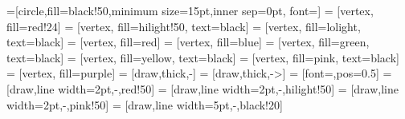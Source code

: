 =[circle,fill=black!50,minimum size=15pt,inner sep=0pt, font=\small]
 = [vertex, fill=red!24]
 = [vertex, fill=hilight!50, text=black]
 = [vertex, fill=lolight, text=black]
 = [vertex, fill=red]
 = [vertex, fill=blue]
 = [vertex, fill=green, text=black]
 = [vertex, fill=yellow, text=black]
 = [vertex, fill=pink, text=black]
 = [vertex, fill=purple]
 = [draw,thick,-]
 = [draw,thick,->]
 = [font=\scriptsize,pos=0.5]
 = [draw,line width=2pt,-,red!50]
 = [draw,line width=2pt,-,hilight!50]
 = [draw,line width=2pt,-,pink!50]
 = [draw,line width=5pt,-,black!20]

\def\hepta{\draw[foreground](A) -- (B) -- (C) -- (D) -- (E) -- (F) -- (G) -- cycle;}


\newcommand{\slice}[1]{%
    \hepta
    \draw[foreground] \foreach \x/\y in {#1} {(\x)--(\y)};
}




{
    \frame{
        \titlepage
    }
}



